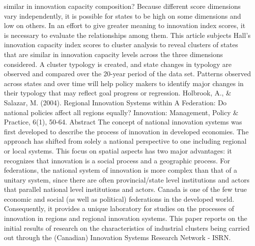 \documentclass[a4paper,11pt]{article}
\begin{document}
similar in innovation capacity composition? Because different score dimensions vary independently, it is possible for states to be high on some dimensions and low on others. In an effort to give greater meaning to innovation index scores, it is necessary to evaluate the relationships among them. This article subjects Hall's innovation capacity index scores to cluster analysis to reveal clusters of states that are similar in innovation capacity levels across the three dimensions considered. A cluster typology is created, and state changes in typology are observed and compared over the 20-year period of the data set. Patterns observed across states and over time will help policy makers to identify major changes in their typology that may reflect goal progress or regression.
Holbrook, A., & Salazar, M. (2004). Regional Innovation Systems within A Federation: Do national policies affect all regions equally? Innovation: Management, Policy & Practice, 6(1), 50-64.
Abstract
The concept of national innovation systems was first developed to describe the process of innovation in developed economies. The approach has shifted from solely a national perspective to one including regional or local systems. This focus on spatial aspects has two major advantages: it recognizes that innovation is a social process and a geographic process. For federations, the national system of innovation is more complex than that of a unitary system, since there are often provincial/state level institutions and actors that parallel national level institutions and actors. Canada is one of the few true economic and social (as well as political) federations in the developed world. Consequently, it provides a unique laboratory for studies on the processes of innovation in regions and regional innovation systems. This paper reports on the initial results of research on the characteristics of industrial clusters being carried out through the (Canadian) Innovation Systems Research Network - ISRN.
 
\end{document}
